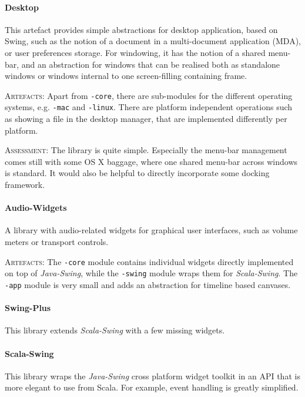 \documentclass[11pt,a4paper]{article}
\newcommand{\software}[1]{\textit{#1}}
\newcommand{\artefacts}[0]{\textsc{Artefacts:}}
\newcommand{\assessment}[0]{\textsc{Assessment:}}
\begin{document}
\paragraph{Desktop}

This artefact provides simple abstractions for desktop application, based on Swing, such as the notion of a document in a multi-document application (MDA), or user preferences storage. For windowing, it has the notion of a shared menu-bar, and an abstraction for windows that can be realised both as standalone windows or windows internal to one screen-filling containing frame.

\artefacts{} Apart from \verb!-core!, there are sub-modules for the different operating systems, e.g. \verb!-mac! and \verb!-linux!. There are platform independent operations such as showing a file in the desktop manager, that are implemented differently per platform. 

\assessment{} The library is quite simple. Especially the menu-bar management comes still with some OS X baggage, where one shared menu-bar across windows is standard. It would also be helpful to directly incorporate some docking framework.

\paragraph{Audio-Widgets}

A library with audio-related widgets for graphical user interfaces, such as volume meters or transport controls.

\artefacts{} The \verb!-core! module contains individual widgets directly implemented on top of \software{Java-Swing}, while the \verb!-swing! module wraps them for \software{Scala-Swing}. The \verb!-app! module is very small and adds an abstraction for timeline based canvases.

\paragraph{Swing-Plus}

This library extends \software{Scala-Swing} with a few missing widgets.

\paragraph{Scala-Swing}

This library wraps the \software{Java-Swing} cross platform widget toolkit in an API that is more elegant to use from Scala. For example, event handling is greatly simplified.
\end{document}

